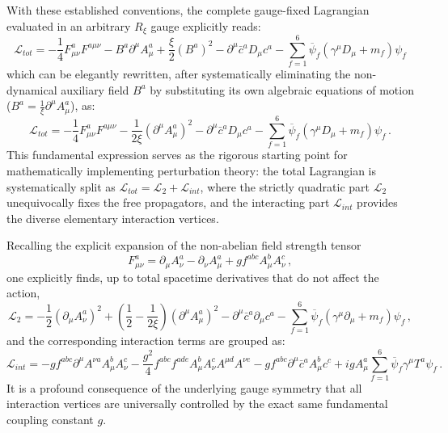 With these established conventions, the complete gauge-fixed Lagrangian evaluated in an arbitrary $R_\xi$ gauge explicitly reads:
\begin{equation} \label{eq:qcd_lagrangian_full}
    \mathcal{L}_{tot} = -\frac{1}{4}F_{\mu\nu}^a F^{a\mu\nu} - B^a\partial^\mu A_\mu^a + \frac{\xi}{2}(B^a)^2 - \partial^\mu \bar{c}^a D_\mu c^a - \sum_{f=1}^6 \overline{\psi}_f(\gamma^\mu D_\mu + m_f)\psi_f
\end{equation}
which can be elegantly rewritten, after systematically eliminating the non-dynamical auxiliary field $B^a$ by substituting its own algebraic equations of motion ($B^a = \frac{1}{\xi}\partial^\mu A_\mu^a$), as:
\begin{equation} \label{eq:qcd_lagrangian_fixed}
    \boxed{\mathcal{L}_{tot} = -\frac{1}{4}F_{\mu\nu}^a F^{a\mu\nu} - \frac{1}{2\xi}(\partial^\mu A_\mu^a)^2 - \partial^\mu \bar{c}^a D_\mu c^a - \sum_{f=1}^6 \overline{\psi}_f(\gamma^\mu D_\mu + m_f)\psi_f \, .}
\end{equation}
This fundamental expression serves as the rigorous starting point for mathematically implementing perturbation theory: the total Lagrangian is systematically split as $\mathcal{L}_{tot} = \mathcal{L}_2 + \mathcal{L}_{int}$, where the strictly quadratic part $\mathcal{L}_2$ unequivocally fixes the free propagators, and the interacting part $\mathcal{L}_{int}$ provides the diverse elementary interaction vertices.

Recalling the explicit expansion of the non-abelian field strength tensor
\begin{equation} \label{eq:field_strength_expansion}
    F_{\mu\nu}^a = \partial_\mu A_\nu^a - \partial_\nu A_\mu^a + g f^{abc} A_\mu^b A_\nu^c \, ,
\end{equation}
one explicitly finds, up to total spacetime derivatives that do not affect the action,
\begin{equation} \label{eq:qcd_lagrangian_quadratic}
    \mathcal{L}_2 = -\frac{1}{2}(\partial_\mu A_\nu^a)^2 + \left(\frac{1}{2} - \frac{1}{2\xi}\right)(\partial^\mu A_\mu^a)^2 - \partial^\mu \bar{c}^a \partial_\mu c^a - \sum_{f=1}^6 \overline{\psi}_f(\gamma^\mu \partial_\mu + m_f)\psi_f \, ,
\end{equation}
and the corresponding interaction terms are grouped as:
\begin{equation} \label{eq:qcd_lagrangian_interaction}
    \mathcal{L}_{int} = - g f^{abc} \partial^\mu A^{\nu a} A_\mu^b A_\nu^c - \frac{g^2}{4} f^{abc} f^{ade} A_\mu^b A_\nu^c A^{\mu d} A^{\nu e} - g f^{abc} \partial^\mu \bar{c}^a A_\mu^b c^c + i g A_\mu^a \sum_{f=1}^6 \overline{\psi}_f \gamma^\mu T^a \psi_f \, .
\end{equation}
It is a profound consequence of the underlying gauge symmetry that all interaction vertices are universally controlled by the exact same fundamental coupling constant $g$.

